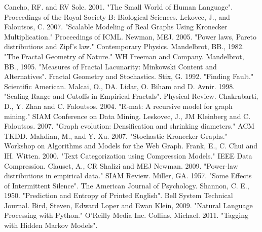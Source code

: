 \documentclass[12pt]{article}
\begin{document}
\begin{thebibliography}{99}
    Cancho, RF. and RV Sole. 2001. "The Small World of Human Language". Proceedings of the Royal Society B: Biological Sciences.
    Lekovec, J., and Faloutsos, C. 2007. "Scalable Modeling of Real Graphs Using Kronecker Multiplication." Proceedings of ICML.
    Newman, MEJ. 2005. "Power laws, Pareto distributions and Zipf's law." Contemporary Physics.
    Mandelbrot, BB., 1982. "The Fractal Geometry of Nature." WH Freeman and Company.
    Mandelbrot, BB., 1995. "Measures of Fractal Lacunarity: Minkowski Content and Alternatives". Fractal Geometry and Stochastics.
    Stix, G. 1992. "Finding Fault." Scientific American.
    Malcai, O., DA. Lidar, O. Biham and D. Avnir. 1998. "Scaling Range and Cutoffs in Empirical Fractals". Physical Review.
    Chakrabarti, D., Y. Zhan and C. Faloutsos. 2004. "R-mat: A recursive model for graph mining." SIAM Conference on Data Mining.
    Leskovec, J., JM Kleinberg and C. Faloutsos. 2007. "Graph evolution: Densification and shrinking diameters." ACM TKDD.
    Mahdian, M., and Y. Xu. 2007. "Stochastic Kronecker Graphs." Workshop on Algorithms and Models for the Web Graph.
    Frank, E., C. Chui and IH. Witten. 2000. "Text Categorization using Compression Models." IEEE Data Compression.
    Clauset, A., CR Shalizi and MEJ Newman. 2009. "Power-law distributions in empirical data." SIAM Review.
    Miller, GA. 1957. "Some Effects of Intermittent Silence". The American Journal of Psychology.
    Shannon, C. E., 1950. "Prediction and Entropy of Printed English". Bell System Technical Journal.
    Bird, Steven, Edward Loper and Ewan Klein, 2009. "Natural Language Processing with Python." O'Reilly Media Inc.
    Collins, Michael. 2011. "Tagging with Hidden Markov Models".
\end{thebibliography}
\end{document}
